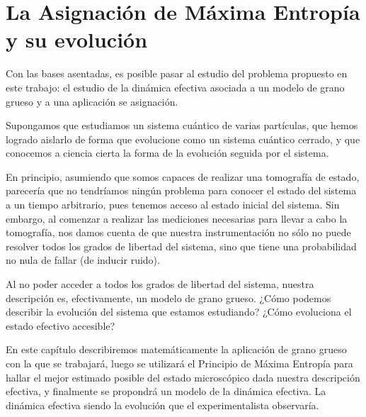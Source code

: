 \chapter{La Asignación de Máxima Entropía y su evolución}\label{ch:3}


Con las bases asentadas, es posible pasar al estudio del problema propuesto en este trabajo: el estudio de la dinámica efectiva asociada a un modelo de grano grueso y a una aplicación se asignación.

Supongamos que estudiamos un sistema cuántico de varias partículas, que hemos logrado aislarlo de forma que evolucione como un sistema cuántico cerrado, y que conocemos a ciencia cierta la forma de la evolución seguida por el sistema.

En principio, asumiendo que somos capaces de realizar una tomografía de estado, parecería que no tendríamos ningún problema para conocer el estado del sistema a un tiempo arbitrario, pues tenemos acceso al estado inicial del sistema. Sin embargo, al comenzar a realizar las mediciones necesarias para llevar a cabo la tomografía, nos damos cuenta de que nuestra instrumentación no sólo no puede resolver todos los grados de libertad del sistema, sino que tiene una probabilidad no nula de fallar (de inducir ruido).

Al no poder acceder a todos los grados de libertad del sistema, nuestra descripción es, efectivamente, un modelo de grano grueso. ¿Cómo podemos describir la evolución del sistema que estamos estudiando? ¿Cómo evoluciona el estado efectivo accesible?

En este capítulo describiremos matemáticamente la aplicación de grano grueso con la que se trabajará, luego se utilizará el Principio de Máxima Entropía para hallar el mejor estimado posible del estado microscópico dada nuestra descripción efectiva, y finalmente se propondrá un modelo de la dinámica efectiva. La dinámica efectiva siendo la evolución que el experimentalista observaría.





\newpage
